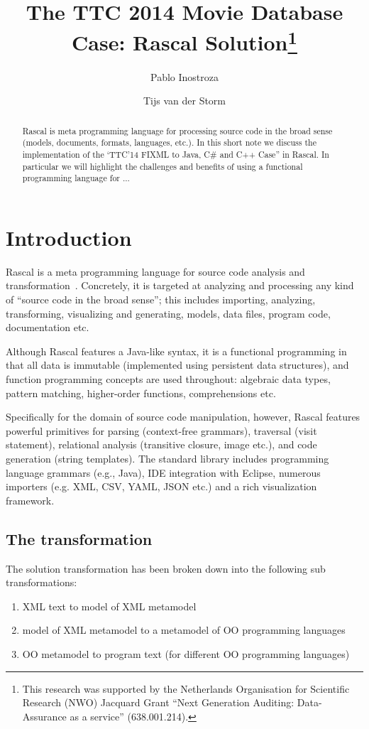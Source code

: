 \documentclass[submission,copyright,creativecommons]{eptcs}
\title{The TTC 2014 Movie Database Case: Rascal Solution\thanks{This
    research was supported by the Netherlands Organisation for
    Scientific Research (NWO) Jacquard Grant ``Next Generation
    Auditing: Data-Assurance as a service'' (638.001.214).}}
\author{Pablo Inostroza \and Tijs van der Storm}
\begin{document}
\maketitle

\begin{abstract}
Rascal is meta programming language for processing source code in the broad sense (models, documents, formats, languages, etc.). In this short note we discuss the implementation of the `TTC'14 FIXML to Java, C\# and C++ Case'' in Rascal. In particular we will highlight the challenges and benefits of using a functional programming language for ...
\end{abstract}

\section{Introduction}

Rascal is a meta programming language for source code analysis and transformation~\cite{Rascal,RascalGTTSE}. 
Concretely, it is targeted at analyzing and processing any kind of ``source code in the broad sense''; this includes importing, analyzing, transforming, visualizing and generating, models, data files, program code, documentation etc.
 
Although Rascal features a Java-like syntax, it is a functional programming in that all data is immutable (implemented using persistent data structures), and function programming concepts are used throughout: algebraic data types, pattern matching, higher-order functions, comprehensions etc. 

Specifically for the domain of source code manipulation, however, Rascal features powerful primitives for parsing (context-free grammars), traversal (visit statement), relational analysis (transitive closure, image etc.), and code generation (string templates). 
The standard library includes programming language grammars (e.g., Java), IDE integration
with Eclipse, numerous importers (e.g. XML, CSV, YAML, JSON etc.) and a rich visualization framework. 

\subsection{The transformation}

The solution transformation has been broken down into the following sub transformations:

\begin{enumerate}
\item XML text to model of XML metamodel
\item model of XML metamodel to a metamodel of OO programming languages
\item OO metamodel to program text (for different OO programming languages)
\end{enumerate}
\end{document}
